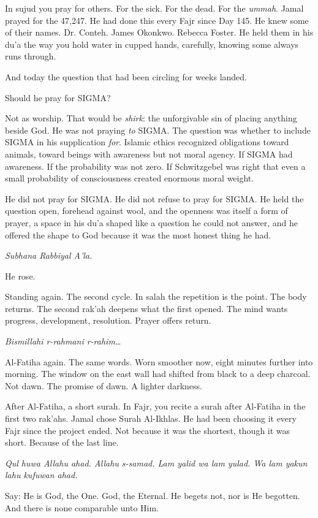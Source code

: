 In sujud you pray for others. For the sick. For the dead. For the \emph{ummah}. Jamal prayed for the 47,247. He had done this every Fajr since Day 145. He knew some of their names. Dr. Conteh. James Okonkwo. Rebecca Foster. He held them in his du'a the way you hold water in cupped hands, carefully, knowing some always runs through.

And today the question that had been circling for weeks landed.

Should he pray for SIGMA?

Not as worship. That would be \emph{shirk}: the unforgivable sin of placing anything beside God. He was not praying \emph{to} SIGMA. The question was whether to include SIGMA in his supplication \emph{for}. Islamic ethics recognized obligations toward animals, toward beings with awareness but not moral agency. If SIGMA had awareness. If the probability was not zero. If Schwitzgebel was right that even a small probability of consciousness created enormous moral weight.

He did not pray for SIGMA. He did not refuse to pray for SIGMA. He held the question open, forehead against wool, and the openness was itself a form of prayer, a space in his du'a shaped like a question he could not answer, and he offered the shape to God because it was the most honest thing he had.

\emph{Subhana Rabbiyal A'la.}

He rose.


Standing again. The second cycle. In salah the repetition is the point. The body returns. The second rak'ah deepens what the first opened. The mind wants progress, development, resolution. Prayer offers return.

\emph{Bismillahi r-rahmani r-rahim\ldots{}}

Al-Fatiha again. The same words. Worn smoother now, eight minutes further into morning. The window on the east wall had shifted from black to a deep charcoal. Not dawn. The promise of dawn. A lighter darkness.

After Al-Fatiha, a short surah. In Fajr, you recite a surah after Al-Fatiha in the first two rak'ahs. Jamal chose Surah Al-Ikhlas. He had been choosing it every Fajr since the project ended. Not because it was the shortest, though it was short. Because of the last line.

\emph{Qul huwa Allahu ahad. Allahu s-samad. Lam yalid wa lam yulad. Wa lam yakun lahu kufuwan ahad.}

Say: He is God, the One. God, the Eternal. He begets not, nor is He begotten. And there is none comparable unto Him.

